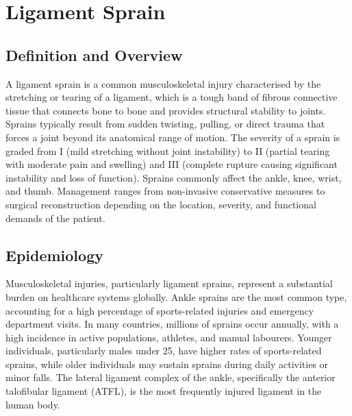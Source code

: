 \chapter{Ligament Sprain}

\section*{Definition and Overview}
A ligament sprain is a common musculoskeletal injury characterised by the stretching or tearing of a ligament, which is a tough band of fibrous connective tissue that connects bone to bone and provides structural stability to joints. Sprains typically result from sudden twisting, pulling, or direct trauma that forces a joint beyond its anatomical range of motion. The severity of a sprain is graded from I (mild stretching without joint instability) to II (partial tearing with moderate pain and swelling) and III (complete rupture causing significant instability and loss of function). Sprains commonly affect the ankle, knee, wrist, and thumb. Management ranges from non-invasive conservative measures to surgical reconstruction depending on the location, severity, and functional demands of the patient.

\section*{Epidemiology}
Musculoskeletal injuries, particularly ligament sprains, represent a substantial burden on healthcare systems globally. Ankle sprains are the most common type, accounting for a high percentage of sports-related injuries and emergency department visits. In many countries, millions of sprains occur annually, with a high incidence in active populations, athletes, and manual labourers. Younger individuals, particularly males under 25, have higher rates of sports-related sprains, while older individuals may sustain sprains during daily activities or minor falls. The lateral ligament complex of the ankle, specifically the anterior talofibular ligament (ATFL), is the most frequently injured ligament in the human body.

